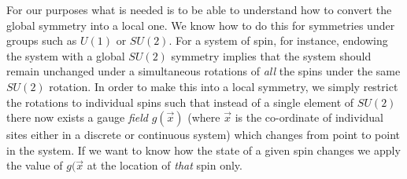 \documentclass[preprint]{SciPost}
\theoremstyle{plain} %
\begin{document}
For our purposes what is needed is to be able to understand how to convert the global symmetry into a local one. We know how to do this for symmetries under groups such as $ U(1) $ or $ SU(2) $. For a system of spin, for instance, endowing the system with a global $ SU(2) $ symmetry implies that the system should remain unchanged under a simultaneous rotations of \emph{all} the spins under the same $ SU(2) $ rotation. In order to make this into a local symmetry, we simply restrict the rotations to individual spins such that instead of a single element of $ SU(2) $ there now exists a gauge \emph{field} $ g(\vec{x}) $ (where $ \vec{x} $ is the co-ordinate of individual sites either in a discrete or continuous system) which changes from point to point in the system. If we want to know how the state of a given spin changes we apply the value of $ g(\vec{x} $ at the location of \emph{that} spin only.
\end{document}
